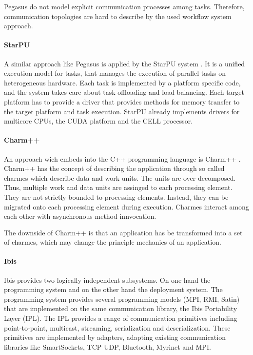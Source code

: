 Pegasus do not model explicit communication processes among tasks.
Therefore, communication topologies are hard to describe by the used
workflow system approach.


\paragraph*{StarPU} 
A similar approach like Pegasus is applied by the StarPU system
\cite{ref:starpu}.  It is a unified execution model for tasks, that
manages the execution of parallel tasks on heterogeneous hardware.
Each task is implemented by a platform specific code, and the system
takes care about task offloading and load balancing. Each target
platform has to provide a driver that provides methods for memory
transfer to the target platform and task execution. StarPU already
implements drivers for multicore CPUs, the CUDA platform and the CELL
processor.

\paragraph*{Charm++} 
An approach wich embeds into the C++ programming language is
Charm++ \cite{ref:charm}. Charm++ has the concept of describing the
application through so called charmes which describe data and work
units. The units are over-decomposed. Thus, multiple work and data
units are assinged to each processing element. They are not strictly
bounded to processing elements. Instead, they can be migrated onto
each processing element during execution. Charmes interact among each
other with asynchronous method innvocation.

The downside of Charm++ is that an application has be transformed into
a set of charmes, which may change the principle mechanics of an
application.

\paragraph*{Ibis} 
Ibis \cite{ref:ibis} provides two logically independent subsystems.
On one hand the programming system and on the other hand the
deployment system. The programming system provides several programming
models (MPI, RMI, Satin) that are implemented on the same
communication library, the Ibis Portability Layer (IPL).  The IPL
provides a range of communication primitives including point-to-point,
multicast, streaming, serialization and deserialization. These
primitives are implemented by adapters, adapting existing
communication libraries like SmartSockets, TCP UDP, Bluetooth, Myrinet and
MPI.

